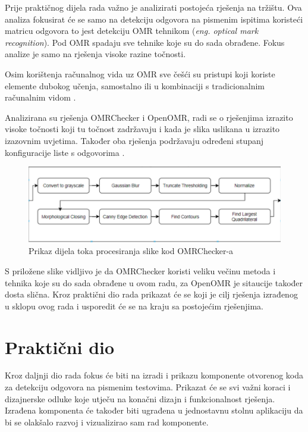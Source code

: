 \documentclass{foi}
\begin{document}
Prije praktičnog dijela rada važno je analizirati postojeća rješenja na tržištu. Ova analiza fokusirat će se samo na detekciju odgovora na pismenim ispitima koristeći matricu odgovora to jest detekciju OMR tehnikom (\textit{eng. optical mark recognition}). Pod OMR spadaju sve tehnike koje su do sada obrađene. Fokus analize je samo na rješenja visoke razine točnosti.

Osim korištenja računalnog vida uz OMR sve češći su pristupi koji koriste elemente dubokog učenja, samostalno ili u kombinaciji s tradicionalnim računalnim vidom \cite{OMRComparsion}.

Analizirana su rješenja OMRChecker i OpenOMR, radi se o rješenjima izrazito visoke točnosti koji tu točnost zadržavaju i kada je slika uslikana u izrazito izazovnim uvjetima. Također oba rješenja podržavaju određeni stupanj konfiguracije liste s odgovorima \cite{OMRComparsion}.

\begin{figure}[H]
    \centering
    \includegraphics[width=1.0\linewidth]{slike/omr_flow.png}
    \caption{Prikaz dijela toka procesiranja slike kod OMRChecker-a \cite{OMRChecker}}
\end{figure}

S priložene slike vidljivo je da OMRChecker koristi veliku večinu metoda i tehnika koje su do sada obrađene u ovom radu, za OpenOMR je sitaucije također dosta slična.
Kroz praktični dio rada prikazat će se koji je cilj rješenja izrađenog u sklopu ovog rada i usporedit će se na kraju sa postojećim rješenjima.

\chapter{Praktični dio}

Kroz daljnji dio rada fokus će biti na izradi i prikazu komponente otvorenog koda za detekciju odgovora na pismenim testovima. Prikazat će se svi važni koraci i dizajnerske odluke koje utječu na konačni dizajn i funkcionalnost rješenja. Izrađena komponenta će također biti ugrađena u jednostavnu stolnu aplikaciju da bi se olakšalo razvoj i vizualizirao sam rad komponente. 
\end{document}
